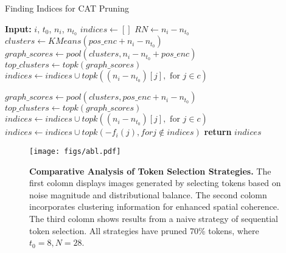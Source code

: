 \documentclass[10pt]{article}
\begin{document}
\begin{algorithm}[H]
\caption{Finding Indices for CAT Pruning}\label{alg:find_indices}
\begin{algorithmic}[1]
\State \textbf{Input:} $i$, $t_0$, $n_i$, $n_{t_0}$
\State $indices \gets []$
\State $RN \gets n_i - n_{t_0}$
    \State $clusters \gets KMeans(pos\_enc+n_i- n_{t_{0}})$ 
    \State $graph\_scores \gets pool(clusters, n_i- n_{t_{0}}+pos\_enc)${}
    \State $top\_clusters \gets topk(graph\_scores)$
        \State $indices \gets indices \cup topk((n_i- n_{t_{0}})[j], \text{ for } j \in c)$
    \EndFor

\Else
    \State $graph\_scores \gets pool(clusters, pos\_enc+n_i- n_{t_{0}})$ 
    \State $top\_clusters \gets topk(graph\_scores)$
        \State $indices \gets indices \cup topk((n_i- n_{t_{0}})[j], \text{ for } j \in c)$
    \EndFor
    \State $indices \gets indices \cup topk(-f_i(j), for j \notin indices )$ 
\EndIf
\State \textbf{return} $indices$
\end{algorithmic}
\end{algorithm}
\vspace{-10pt}
\begin{figure}[H]
    \setlength{\abovecaptionskip}{5pt}
    \setlength{\belowcaptionskip}{0pt}
    \centering
    \texttt{[image: figs/abl.pdf]}
    
    \caption{\textbf{Comparative Analysis of Token Selection Strategies.} The first colomn displays images generated by selecting tokens based on noise magnitude and distributional balance. The second colomn incorporates clustering information for enhanced spatial coherence. The third colomn shows results from a naive strategy of sequential token selection. All strategies have pruned 70\% tokens, where $t_0 = 8, N = 28$.\\}
    \label{fig:abl}
\end{figure}
\end{document}
